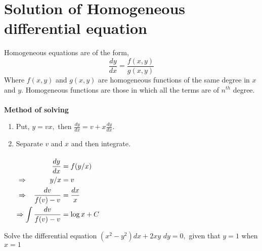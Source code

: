 \section{Solution of Homogeneous differential equation}
Homogeneous equations are of the form,
$$
\frac{d y}{d x}=\frac{f(x, y)}{g(x, y)}
$$
Where $f(x, y)$ and $g(x, y)$ are homogeneous functions of the same degree in $x$ and $y$. Homogeneous functions are those in which all the terms are of $n^{th}$  degree.\\\\ 
\textbf{\large Method of solving}
\begin{enumerate}
	\item  Put, $y=v x,$ then $\frac{d y}{d x}=v+x \frac{d y}{d x}$.
	\item  Separate $v$ and $x$ and then integrate.\\\\
	$
	\begin{aligned}
	 \frac{d y}{d x}&=f(y / x) \\
	\Rightarrow  \hspace{1.1cm}y / x&=v \\
	\Rightarrow \hspace{0.3cm}\frac{d v}{f(v)-v}&=\frac{d x}{x} \\
	\Rightarrow  \int \frac{d v}{f(v)-v}&=\log x+C 
	\end{aligned}
	$
\end{enumerate}
\begin{exercise}
	Solve the differential equation $\left(x^{2}-y^{2}\right) d x+2 x y$ $d y=0,$ given that $y=1$ when $x=1$
\end{exercise}
